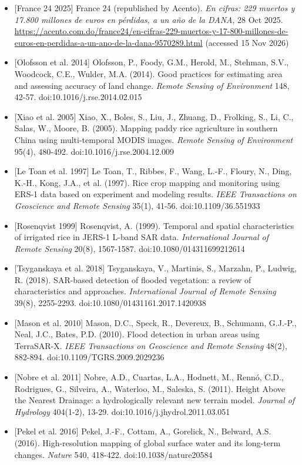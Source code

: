 \documentclass[10pt,twocolumn]{article}
\begin{document}
\begin{itemize}
\item{} [France 24 2025] France 24 (republished by Acento). \emph{En cifras: 229 muertos y 17.800 millones de euros en pérdidas, a un año de la DANA}, 28 Oct 2025. \url{https://acento.com.do/france24/en-cifras-229-muertos-y-17-800-millones-de-euros-en-perdidas-a-un-ano-de-la-dana-9570289.html} (accessed 15 Nov 2026)
\item{} [Olofsson et al. 2014] Olofsson, P., Foody, G.M., Herold, M., Stehman, S.V., Woodcock, C.E., Wulder, M.A. (2014). Good practices for estimating area and assessing accuracy of land change. \emph{Remote Sensing of Environment} 148, 42-57. doi:10.1016/j.rse.2014.02.015
\item{} [Xiao et al. 2005] Xiao, X., Boles, S., Liu, J., Zhuang, D., Frolking, S., Li, C., Salas, W., Moore, B. (2005). Mapping paddy rice agriculture in southern China using multi-temporal MODIS images. \emph{Remote Sensing of Environment} 95(4), 480-492. doi:10.1016/j.rse.2004.12.009
\item{} [Le Toan et al. 1997] Le Toan, T., Ribbes, F., Wang, L.-F., Floury, N., Ding, K.-H., Kong, J.A., et al. (1997). Rice crop mapping and monitoring using ERS-1 data based on experiment and modeling results. \emph{IEEE Transactions on Geoscience and Remote Sensing} 35(1), 41-56. doi:10.1109/36.551933
\item{} [Rosenqvist 1999] Rosenqvist, A. (1999). Temporal and spatial characteristics of irrigated rice in JERS-1 L-band SAR data. \emph{International Journal of Remote Sensing} 20(8), 1567-1587. doi:10.1080/014311699212614
\item{} [Tsyganskaya et al. 2018] Tsyganskaya, V., Martinis, S., Marzahn, P., Ludwig, R. (2018). SAR-based detection of flooded vegetation: a review of characteristics and approaches. \emph{International Journal of Remote Sensing} 39(8), 2255-2293. doi:10.1080/01431161.2017.1420938
\item{} [Mason et al. 2010] Mason, D.C., Speck, R., Devereux, B., Schumann, G.J.-P., Neal, J.C., Bates, P.D. (2010). Flood detection in urban areas using TerraSAR-X. \emph{IEEE Transactions on Geoscience and Remote Sensing} 48(2), 882-894. doi:10.1109/TGRS.2009.2029236
\item{} [Nobre et al. 2011] Nobre, A.D., Cuartas, L.A., Hodnett, M., Rennó, C.D., Rodrigues, G., Silveira, A., Waterloo, M., Saleska, S. (2011). Height Above the Nearest Drainage: a hydrologically relevant new terrain model. \emph{Journal of Hydrology} 404(1-2), 13-29. doi:10.1016/j.jhydrol.2011.03.051
\item{} [Pekel et al. 2016] Pekel, J.-F., Cottam, A., Gorelick, N., Belward, A.S. (2016). High-resolution mapping of global surface water and its long-term changes. \emph{Nature} 540, 418-422. doi:10.1038/nature20584

\end{itemize}
\end{document}
